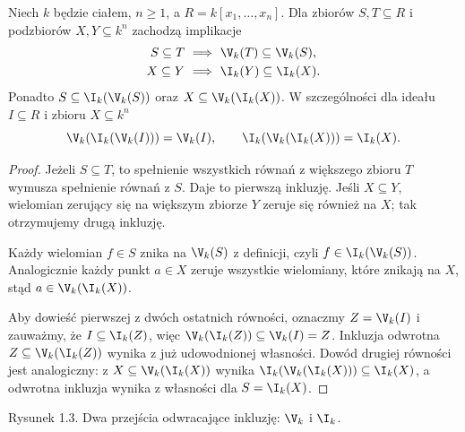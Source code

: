 \begin{twierdzenie}
\label{tw:galois}
Niech $k$ będzie ciałem, $n\ge1$, a $R=k[x_1,\dots,x_n]$.
Dla zbiorów $S,T\subseteq R$ i podzbiorów $X,Y\subseteq k^n$
zachodzą implikacje
\begin{align*}
S\subseteq T&\ \Longrightarrow\ \V_k(T)\subseteq\V_k(S),\\
X\subseteq Y&\ \Longrightarrow\ \I_k(Y)\subseteq\I_k(X).
\end{align*}
Ponadto $S\subseteq\I_k(\V_k(S))$ oraz
$X\subseteq\V_k(\I_k(X))$.
W szczególności dla ideału $I\subseteq R$ i zbioru $X\subseteq k^n$
\[
\V_k(\I_k(\V_k(I)))=\V_k(I),\qquad
\I_k(\V_k(\I_k(X)))=\I_k(X).
\]
\end{twierdzenie}
\begin{proof}
Jeżeli $S\subseteq T$, to spełnienie wszystkich równań
z większego zbioru $T$ wymusza spełnienie równań z $S$.
Daje to pierwszą inkluzję. Jeśli $X\subseteq Y$, wielomian
zerujący się na większym zbiorze $Y$ zeruje się również na $X$;
tak otrzymujemy drugą inkluzję.

Każdy wielomian $f\in S$ znika na $\V_k(S)$ z definicji,
czyli $f\in\I_k(\V_k(S))$. Analogicznie każdy punkt $a\in X$
zeruje wszystkie wielomiany, które znikają na $X$, stąd
$a\in\V_k(\I_k(X))$.

Aby dowieść pierwszej z dwóch ostatnich równości, oznaczmy
$Z=\V_k(I)$ i zauważmy, że $I\subseteq\I_k(Z)$, więc
$\V_k(\I_k(Z))\subseteq\V_k(I)=Z$. Inkluzja odwrotna
$Z\subseteq\V_k(\I_k(Z))$ wynika z już udowodnionej własności.
Dowód drugiej równości jest analogiczny: z
$X\subseteq\V_k(\I_k(X))$ wynika
$\I_k(\V_k(\I_k(X)))\subseteq\I_k(X)$,
a odwrotna inkluzja wynika z własności dla $S=\I_k(X)$.
\end{proof}

\begin{center}
\end{center}
\begin{center}\small Rysunek 1.3. Dwa przejścia odwracające inkluzję: $\V_k$ i $\I_k$.\end{center}

